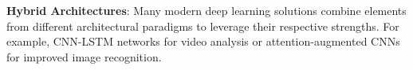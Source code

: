 \textbf{Hybrid Architectures}:
Many modern deep learning solutions combine elements from different architectural paradigms to leverage their respective strengths. For example, CNN-LSTM networks for video analysis or attention-augmented CNNs for improved image recognition.







